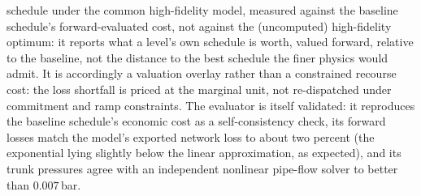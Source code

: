 \documentclass[a4paper,fleqn]{cas-sc} %
\begin{document}
{{schedule under the common high-fidelity model, measured against the baseline schedule's
forward-evaluated cost, not against the (uncomputed) high-fidelity optimum: it reports what a
level's own schedule is worth, valued forward, relative to the baseline, not the distance to
the best schedule the finer physics would admit. It is accordingly a valuation overlay rather
than a constrained recourse cost: the loss shortfall is priced at the marginal unit, not
re-dispatched under commitment and ramp constraints. The evaluator
is itself validated: it reproduces the baseline schedule's economic cost as a self-consistency
check, its forward losses match the model's exported network loss to about two percent (the
exponential lying slightly below the linear approximation, as expected), and its trunk
pressures agree with an independent nonlinear pipe-flow solver to better than $0.007$\,bar.
}

}
\end{document}
